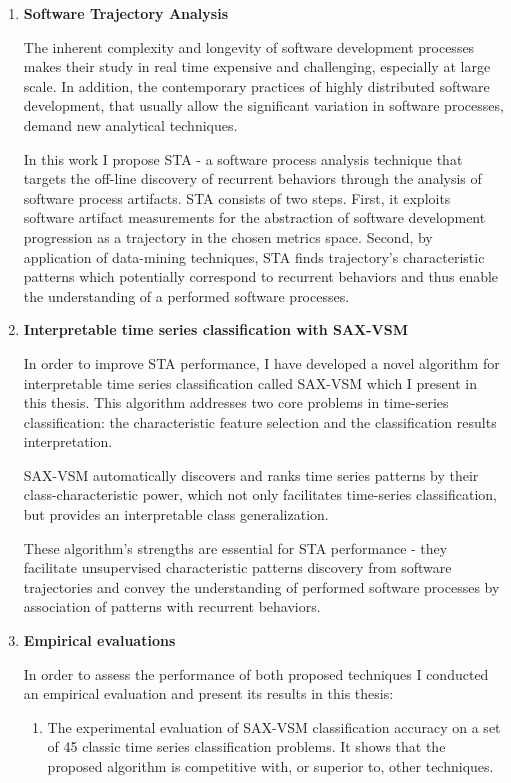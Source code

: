 \begin{enumerate}

\item \textbf{Software Trajectory Analysis}

The inherent complexity and longevity of software development processes makes their study in real time
expensive and challenging, especially at large scale. 
In addition, the contemporary practices of highly distributed software development, that usually allow 
the significant variation in software processes, demand new analytical techniques.

In this work I propose STA - a software process analysis technique that targets the off-line discovery 
of recurrent behaviors through the analysis of software process artifacts. 
STA consists of two steps. 
First, it exploits software artifact measurements for the abstraction of software development 
progression as a trajectory in the chosen metrics space. 
Second, by application of data-mining techniques, STA finds trajectory's characteristic 
patterns which potentially correspond to recurrent behaviors and thus enable the understanding of a 
performed software processes.

\item \textbf{Interpretable time series classification with SAX-VSM}

In order to improve STA performance, I have developed a novel algorithm for interpretable time 
series classification called SAX-VSM which I present in this thesis. 
This algorithm addresses two core problems in time-series classification: 
the characteristic feature selection and the classification results interpretation. 

SAX-VSM automatically discovers and ranks time series patterns by their
class-characteristic power, 
which not only facilitates time-series classification, but provides an interpretable class
generalization.

These algorithm's strengths are essential for STA performance - they facilitate unsupervised characteristic 
patterns discovery from software trajectories and convey the understanding of performed software processes 
by association of patterns with recurrent behaviors.

\item \textbf{Empirical evaluations}

In order to assess the performance of both proposed techniques I conducted an empirical evaluation and 
present its results in this thesis:
\begin{enumerate}
 \item The experimental evaluation of SAX-VSM classification accuracy on a set of 45 classic time series 
classification problems. It shows that the proposed algorithm is competitive with, or superior
to, other 
techniques.


\end{enumerate}
\end{enumerate}
